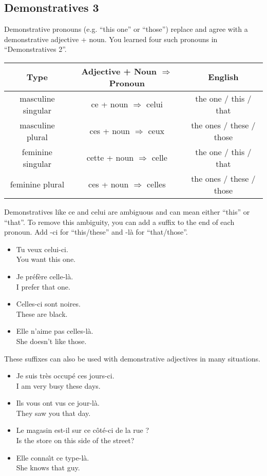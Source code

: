 \pagebreak
\subsection{Demonstratives 3}

Demonstrative pronouns (e.g. ``this one'' or ``those'') replace and agree with a demonstrative adjective + noun.  You learned four such pronouns in ``Demonstratives 2''.

\begin{center}\begin{tabular}{|c|c|c|}
\hline
\textbf{Type}      & \textbf{Adjective + Noun $\Rightarrow$ Pronoun} & \textbf{English}         \\ \hline
masculine singular & ce + noun $\Rightarrow$ celui                   & the one / this / that    \\ \hline
masculine plural   & ces + noun $\Rightarrow$ ceux                   & the ones / these / those \\ \hline
feminine singular  & cette + noun $\Rightarrow$ celle                & the one / this / that    \\ \hline
feminine plural    & ces + noun $\Rightarrow$ celles                 & the ones / these / those \\ \hline
\end{tabular}\end{center}

Demonstratives like ce and celui are ambiguous and can mean either ``this'' or ``that''. To remove this ambiguity, you can add a suffix to the end of each pronoun. Add -ci for ``this/these'' and -l{\`a} for ``that/those''.

\begin{itemize}
  \item  Tu veux celui-ci. \\ You want this one.
	\item  Je pr{\'e}f{\`e}re celle-l{\`a}. \\ I prefer that one.
	\item  Celles-ci sont noires. \\ These are black.
	\item  Elle n'aime pas celles-l{\`a}. \\ She doesn't like those.
\end{itemize}

These suffixes can also be used with demonstrative adjectives in many situations.

\begin{itemize}
  \item  Je suis tr{\`e}s occup{\'e} ces jours-ci. \\ I am very busy these days.
	\item  Ils vous ont vus ce jour-l{\`a}. \\ They saw you that day.
	\item  Le magasin est-il sur ce c{\^o}t{\'e}-ci de la rue ? \\ Is the store on this side of the street?
	\item  Elle conna{\^{\i}}t ce type-l{\`a}. \\ She knows that guy.
\end{itemize}

